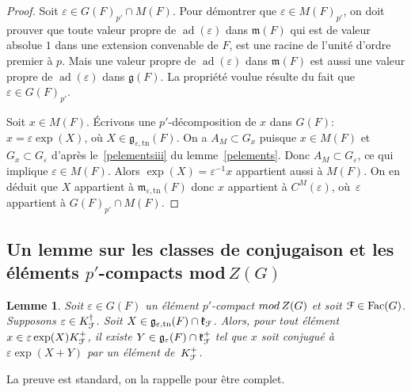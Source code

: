 \documentclass[11pt]{article}
\newcommand{\Subsection}{\subsection}
\numberwithin{equation}{section}\providecommand{\og}{«\,}\providecommand{\fg}{\,»}
\let\mathcal \EuScript
\let\epsilon\varepsilon
\newcommand{\rmod}{\textup{mod}\,}
\newcommand{\frg}{\mathfrak{g}}
\newcommand{\frk}{\mathfrak{k}}
\newcommand{\mfrm}{\mathfrak{m}}
\newcommand{\Fac}{\mathrm{Fac}}
\newcommand{\tn}{\mathrm{tn}}
\DeclareMathOperator{\ad}{ad}
\newcommand{\cF}{\mathcal{F}}
\theoremstyle{plain}
\newtheorem*{lem*}{Lemme}
\theoremstyle{definition}
\begin{document}
\begin{proof}
Soit $\epsilon\in G(F)_{p'}\cap M(F)$. Pour démontrer que $\epsilon\in M(F)_{p'}$, on doit prouver que toute valeur propre de $\ad(\epsilon)$ dans $\mfrm(F)$ qui est de valeur absolue $1$ dans une extension convenable de $F$, est une racine de l'unité d'ordre premier à $p$. Mais une valeur propre de $\ad(\epsilon)$ dans $\mfrm(F)$ est aussi une valeur propre de $\ad(\epsilon)$ dans $\frg(F)$. La propriété voulue résulte du fait que $\epsilon\in G(F)_{p'}$.

Soit $x\in M(F)$.
Écrivons une $p'$-décomposition de $x$ dans $G(F)$: $x=\epsilon \exp(X)$, où $X\in \frg_{\epsilon,\tn}(F)$.
On a $A_{M}\subset G_{x} $ puisque $x\in M(F)$ et $G_{x}\subset G_{\epsilon}$ d'après le~\eqref{pelementsiii} du lemme~\ref{pelements}. Donc $A_{M}\subset G_{\epsilon}$, ce qui implique $\epsilon\in M(F)$. Alors $\exp(X)=\epsilon^{-1}x$ appartient aussi à $M(F)$. On en déduit que $X$ appartient à $\mfrm_{\epsilon,\tn}(F)$ donc $x$ appartient à $C^M(\epsilon)$, où~$\epsilon$ appartient à $G(F)_{p'}\cap M(F)$.
\end{proof}

\Subsection{Un lemme sur les classes de conjugaison et les éléments \texorpdfstring{$p'$-compacts mod\,$Z(G)$}{pZG}}\label{commutant}

\begin{lem*}
Soit $\epsilon\in G(F)$ un élément $p'$-compact $\rmod Z(G)$ et soit $\cF\in \Fac(G)$. Supposons $\epsilon\in K_{\cF}^{\dag}$. Soit $X\in \frg_{\epsilon,\tn}(F)\cap \frk_{\cF}$. Alors, pour tout élément $x\in \epsilon \exp(X) K_{\cF}^+$, il existe $Y\in \frg_{\epsilon}(F)\cap \frk_{\cF}^+$ tel que $x$ soit conjugué à $\epsilon \exp(X+Y)$ par un élément de~$K_{\cF}^+$.
\end{lem*}

La preuve est standard, on la rappelle pour être complet.
\end{document}
